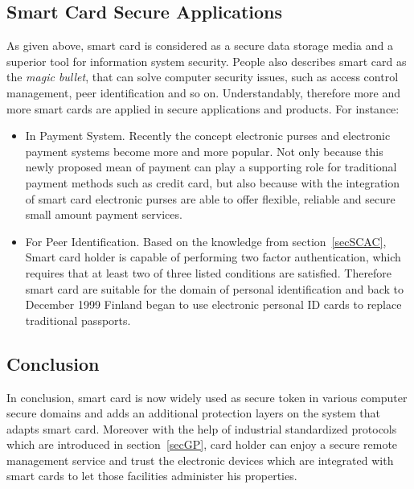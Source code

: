 \subsection{Smart Card Secure Applications}
As given above, smart card is considered as a secure data storage media and a superior tool for information system security. People also describes smart card as the \emph{magic bullet}, that can solve computer security issues, such as access control management, peer identification and so on. Understandably, therefore more and more smart cards are applied in secure applications and products. For instance:
\begin{itemize}
\item In Payment System. Recently the concept electronic purses and electronic payment systems become more and more popular. Not only because this newly proposed mean of payment can play a supporting role for traditional payment methods such as credit card, but also because with the integration of smart card electronic purses are able to offer flexible, reliable and secure  small amount payment services\cite{handbook}.
\item For Peer Identification. Based on the knowledge from section~\ref{secSCAC}, Smart card holder is  capable of performing two factor authentication\cite{smart_card_history}, which requires that at least two of three listed conditions are satisfied. Therefore smart card are suitable for the domain of personal identification and back to December 1999 Finland began to use electronic personal ID cards to replace traditional passports\cite{handbook}. 
\end{itemize}
\subsection{Conclusion}
In conclusion, smart card  is now widely used as secure token in various computer secure domains and adds an additional protection layers on the system that adapts smart card. Moreover with the help of industrial standardized protocols which are introduced in section~\ref{secGP}, card holder can enjoy a secure remote management service and trust the electronic devices which are integrated with smart cards to let those facilities administer his properties.  


